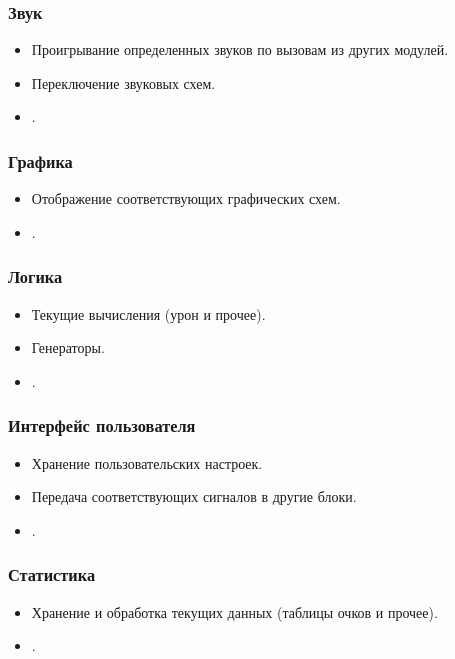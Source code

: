 \documentclass[12pt,a4paper,fullpage]{article}
\begin{document}
\subsubsection{Звук}
\begin{itemize}
	\item Проигрывание определенных звуков по вызовам из других модулей.
	\item Переключение звуковых схем.
	\item .\\
\end{itemize}

\subsubsection{Графика}
\begin{itemize}
	\item Отображение соответствующих графических схем.
	\item .\\
\end{itemize}

\subsubsection{Логика}
\begin{itemize}
	\item Текущие вычисления (урон и прочее).
	\item Генераторы.
	\item .\\
\end{itemize}

\subsubsection{Интерфейс пользователя}
\begin{itemize}
	\item Хранение пользовательских настроек.
	\item Передача соответствующих сигналов в другие блоки.
	\item .\\
\end{itemize}

\subsubsection{Статистика}
\begin{itemize}
	\item Хранение и обработка текущих данных (таблицы очков и прочее).
	\item .\\
\end{itemize}
\end{document}
